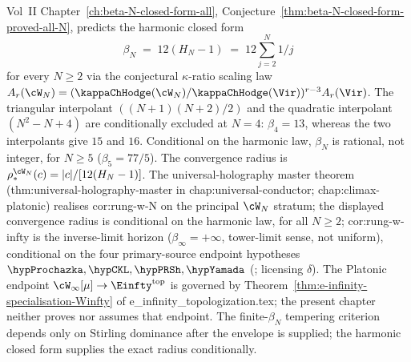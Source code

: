 \begin{remark}%
\label{rem:anchor-wn-closure-beta-exact}%
%
%
Vol~II Chapter~\ref{ch:beta-N-closed-form-all},
Conjecture~\ref{thm:beta-N-closed-form-proved-all-N}, predicts the
harmonic closed form
\[
 \beta_N \;=\; 12 (H_N - 1) \;=\; 12 \sum_{j=2}^{N} 1/j
\]
for every $N \ge 2$ via the conjectural
$\kappa$-ratio scaling law $A_r(\cW_N) = (\kappaChHodge(\cW_N) /
\kappaChHodge(\Vir))^{r-3} A_r(\Vir)$. The triangular interpolant
$((N+1)(N+2)/2)$ and the quadratic interpolant $(N^2 - N + 4)$ are
conditionally excluded at $N=4$:
$\beta_4 = 13$, whereas the two interpolants give $15$ and $16$.
Conditional on the harmonic law, $\beta_N$ is rational, not integer, for $N \ge 5$
($\beta_5 = 77/5$). The convergence radius is
$\rho_*^{\cW_N}(c) = |c| / [12 (H_N - 1)]$.
The universal-holography master theorem
(\textsf{thm:universal-holography-master} in
\textsf{chap:universal-conductor}; \textsf{chap:climax-platonic})
realises \textsf{cor:rung-w-N} on the principal $\cW_N$ stratum; the
displayed convergence radius is conditional on the harmonic law, for
all $N \ge 2$;
\textsf{cor:rung-w-infty} is the inverse-limit horizon
($\beta_\infty = +\infty$, tower-limit sense, not uniform), conditional
on the four primary-source endpoint hypotheses
$\hypProchazka, \hypCKL, \hypPRSh, \hypYamada$
(\cite{ProchazkaRapcak18,CKL-parafermion,PopeRomansShen-winfty-wedge,
Bakas-Winfty,Yamada}; licensing $\delta$). The Platonic endpoint
$\cW_\infty[\mu]\to\Einfty^{\mathrm{top}}$ is governed by
Theorem~\textup{\ref{thm:e-infinity-specialisation-Winfty}} of
\textsf{e\_infinity\_topologization.tex}; the present chapter
neither proves nor assumes that endpoint. The
finite-$\beta_N$ tempering criterion depends only on Stirling
dominance after the envelope is supplied; the harmonic closed form
supplies the exact radius conditionally.
\end{remark}
